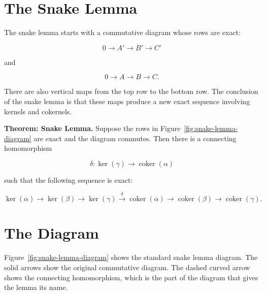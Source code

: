 \section{The Snake Lemma}
\label{sec:snake-lemma}

The snake lemma starts with a commutative diagram whose rows are exact:

\begin{equation}
0 \longrightarrow A' \longrightarrow B' \longrightarrow C'
\end{equation}

and

\begin{equation}
0 \longrightarrow A \longrightarrow B \longrightarrow C.
\end{equation}

There are also vertical maps from the top row to the bottom row. The conclusion of the snake lemma is that these maps produce a new exact sequence involving kernels and cokernels.

\noindent\textbf{Theorem: Snake Lemma.}
Suppose the rows in Figure~\ref{fig:snake-lemma-diagram} are exact and the diagram commutes. Then there is a connecting homomorphism

\begin{equation}
\delta:\ker(\gamma)\longrightarrow \operatorname{coker}(\alpha)
\label{eq:connecting-homomorphism}
\end{equation}

such that the following sequence is exact:

\begin{equation}
\ker(\alpha)
\longrightarrow
\ker(\beta)
\longrightarrow
\ker(\gamma)
\xrightarrow{\delta}
\operatorname{coker}(\alpha)
\longrightarrow
\operatorname{coker}(\beta)
\longrightarrow
\operatorname{coker}(\gamma).
\label{eq:snake-lemma-conclusion}
\end{equation}

\section{The Diagram}
\label{sec:snake-diagram}

Figure~\ref{fig:snake-lemma-diagram} shows the standard snake lemma diagram. The solid arrows show the original commutative diagram. The dashed curved arrow shows the connecting homomorphism, which is the part of the diagram that gives the lemma its name.

